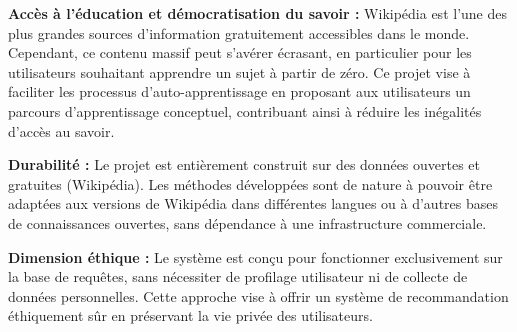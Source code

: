 \textbf{Accès à l'éducation et démocratisation du savoir :}
Wikipédia est l'une des plus grandes sources d'information gratuitement accessibles dans le monde. Cependant, ce contenu massif peut s'avérer écrasant, en particulier pour les utilisateurs souhaitant apprendre un sujet à partir de zéro. Ce projet vise à faciliter les processus d'auto-apprentissage en proposant aux utilisateurs un parcours d'apprentissage conceptuel, contribuant ainsi à réduire les inégalités d'accès au savoir.

\textbf{Durabilité :}
Le projet est entièrement construit sur des données ouvertes et gratuites (Wikipédia). Les méthodes développées sont de nature à pouvoir être adaptées aux versions de Wikipédia dans différentes langues ou à d'autres bases de connaissances ouvertes, sans dépendance à une infrastructure commerciale.

\textbf{Dimension éthique :}
Le système est conçu pour fonctionner exclusivement sur la base de requêtes, sans nécessiter de profilage utilisateur ni de collecte de données personnelles. Cette approche vise à offrir un système de recommandation éthiquement sûr en préservant la vie privée des utilisateurs.
